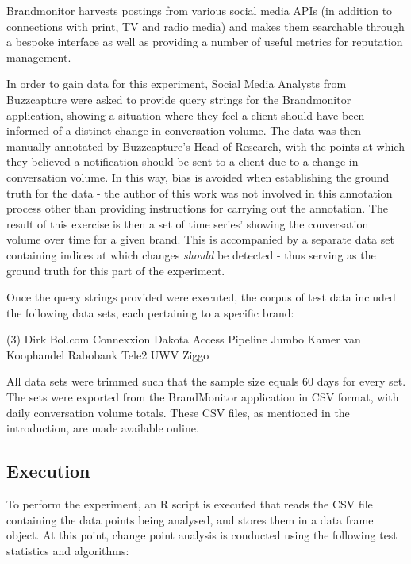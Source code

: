 \documentclass[../main.tex]{subfiles}
\begin{document}
Brandmonitor harvests postings from various social media APIs (in addition to connections with print, TV and radio media) and makes them searchable through a bespoke interface as well as providing a number of useful metrics for reputation management.

In order to gain data for this experiment, Social Media Analysts from Buzzcapture were asked to provide query strings for the Brandmonitor application, showing a situation where they feel a client should have been informed of a distinct change in conversation volume. The data was then manually annotated by Buzzcapture's Head of Research, with the points at which they believed a notification should be sent to a client due to a change in conversation volume. In this way, bias is avoided when establishing the ground truth for the data - the author of this work was not involved in this annotation process other than providing instructions for carrying out the annotation. The result of this exercise is then a set of time series' showing the conversation volume over time for a given brand. This is accompanied by a separate data set containing indices at which changes \emph{should} be detected - thus serving as the ground truth for this part of the experiment.

Once the query strings provided were executed, the corpus of test data included the following data sets, each pertaining to a specific brand:

\begin{tasks}[label=$\bullet$](3)
\task Dirk
\task Bol.com
\task Connexxion
\task Dakota Access Pipeline
\task Jumbo
\task Kamer van Koophandel
\task Rabobank
\task Tele2
\task UWV
\task Ziggo 
\end{tasks}

All data sets were trimmed such that the sample size equals 60 days for every set. The sets were exported from the BrandMonitor application in CSV format, with daily conversation volume totals. These CSV files, as mentioned in the introduction, are made available online.

\subsection{Execution}

To perform the experiment, an \textsf{R} script is executed that reads the CSV file containing the data points being analysed, and stores them in a data frame object. At this point, change point analysis is conducted using the following test statistics and algorithms:
\end{document}
